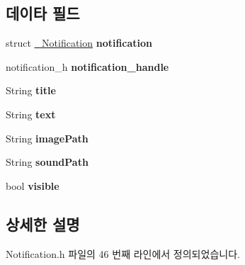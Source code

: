 \subsection*{데이타 필드}
\begin{DoxyCompactItemize}
\item 
\hypertarget{structNotificationExtend_a7e3b5846fc96caa1bf325b063f5b56ec}{struct \hyperlink{struct__Notification}{\-\_\-\-Notification} {\bfseries notification}}\label{structNotificationExtend_a7e3b5846fc96caa1bf325b063f5b56ec}

\item 
\hypertarget{structNotificationExtend_a1c5a3131495086704fd49c62b63f95d6}{notification\-\_\-h {\bfseries notification\-\_\-handle}}\label{structNotificationExtend_a1c5a3131495086704fd49c62b63f95d6}

\item 
\hypertarget{structNotificationExtend_a499aeec850a240ae1aecd939c5043590}{String {\bfseries title}}\label{structNotificationExtend_a499aeec850a240ae1aecd939c5043590}

\item 
\hypertarget{structNotificationExtend_a685ed5195435d2b3e75433f46aec6e1e}{String {\bfseries text}}\label{structNotificationExtend_a685ed5195435d2b3e75433f46aec6e1e}

\item 
\hypertarget{structNotificationExtend_a7480fd65ec0c3010b75b111ed2611adb}{String {\bfseries image\-Path}}\label{structNotificationExtend_a7480fd65ec0c3010b75b111ed2611adb}

\item 
\hypertarget{structNotificationExtend_ac2d6721b778cd06197fc40a5595c54e1}{String {\bfseries sound\-Path}}\label{structNotificationExtend_ac2d6721b778cd06197fc40a5595c54e1}

\item 
\hypertarget{structNotificationExtend_aa54a57ae048476d840caf6d4d2c47aa3}{bool {\bfseries visible}}\label{structNotificationExtend_aa54a57ae048476d840caf6d4d2c47aa3}

\end{DoxyCompactItemize}


\subsection{상세한 설명}


Notification.\-h 파일의 46 번째 라인에서 정의되었습니다.



